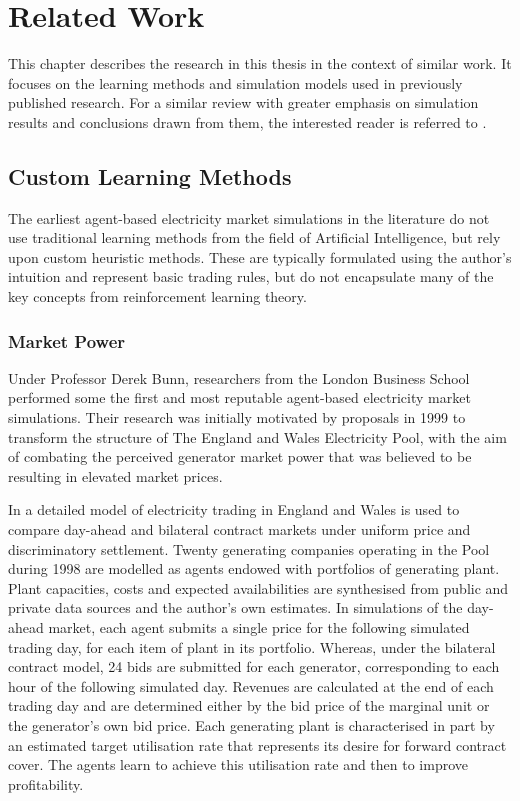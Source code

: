 \chapter{Related Work}
\label{ch:related_work}
This chapter describes the research in this thesis in the context of similar
work.  It focuses on the learning methods and simulation models used in
previously published research.  For a similar review with greater emphasis on
simulation results and conclusions drawn from them, the interested reader is
referred to .

\section{Custom Learning Methods}
The earliest agent-based electricity market simulations in the literature do not
use traditional learning methods from the field of Artificial Intelligence, but
rely upon custom heuristic methods.  These are typically formulated using the
author's intuition and represent basic trading rules, but do not encapsulate
many of the key concepts from reinforcement learning theory.

\subsection{Market Power}
Under Professor Derek Bunn, researchers from the London Business School
performed some the first and most reputable agent-based electricity market
simulations.  Their research was initially motivated by proposals in 1999 to
transform the structure of The England and Wales Electricity Pool, with the aim
of combating the perceived generator market power that was believed to be
resulting in elevated market prices.

In  a detailed model of electricity trading in England and
Wales is used to compare day-ahead and bilateral contract markets under uniform
price and discriminatory settlement.  Twenty generating companies operating in
the Pool during 1998 are modelled as agents endowed with portfolios of
generating plant.  Plant capacities, costs and expected availabilities are
synthesised from public and private data sources and the author's own estimates.
 In simulations of the day-ahead market, each agent submits a single price for
the following simulated trading day, for each item of plant in its portfolio.
Whereas, under the bilateral contract model, 24 bids are submitted for each
generator, corresponding to each hour of the following simulated day.  Revenues
are calculated at the end of each trading day and are determined either by the
bid price of the marginal unit or the generator's own bid price.  Each
generating plant is characterised in part by an estimated target utilisation
rate that represents its desire for forward contract cover.  The agents learn to
achieve this utilisation rate and then to improve profitability.


